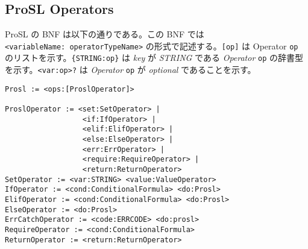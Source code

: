 \hypertarget{prosl-operators}{%
\subsection{ProSL Operators}\label{prosl-operators}}

ProSL の BNF は以下の通りである。この BNF では
\texttt{\textless{}variableName:\ operatorTypeName\textgreater{}}
の形式で記述する。\texttt{{[}op{]}} は Operator \texttt{op}
のリストを示す。\texttt{\{STRING:op\}} は \emph{key} が \emph{STRING}
である \emph{Operator} \texttt{op}
の辞書型を示す。\texttt{\textless{}var:op\textgreater{}?} は
\emph{Operator} \texttt{op} が \emph{optional} であることを示す。

\begin{verbatim}
Prosl := <ops:[ProslOperator]>

ProslOperator := <set:SetOperator> |
                  <if:IfOperator> |
                  <elif:ElifOperator> |
                  <else:ElseOperator> |
                  <err:ErrOperator> |
                  <require:RequireOperator> |
                  <return:ReturnOperator>
SetOperator := <var:STRING> <value:ValueOperator>
IfOperator := <cond:ConditionalFormula> <do:Prosl>
ElifOperator := <cond:ConditionalFormula> <do:Prosl>
ElseOperator := <do:Prosl>
ErrCatchOperator := <code:ERRCODE> <do:prosl>
RequireOperator := <cond:ConditionalFormula>
ReturnOperator := <return:ReturnOperator>


\end{verbatim}
